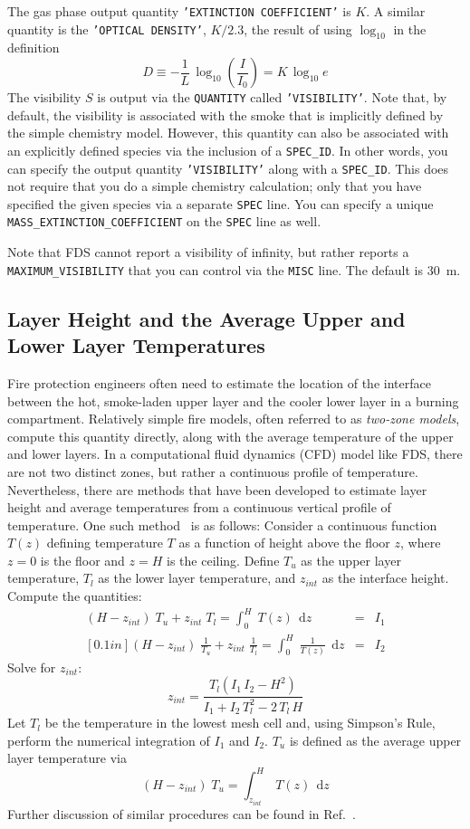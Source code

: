 \documentclass[11pt]{book}
\newcommand{\ct}{\tt\small}
\renewcommand{\d}{\,\mathrm{d}}
\newcommand{\be}{\begin{equation}}
\newcommand{\ee}{\end{equation}}
\begin{document}
The gas phase output quantity {\ct 'EXTINCTION COEFFICIENT'} is $K$. A similar quantity is the
{\ct 'OPTICAL DENSITY'}, $K/2.3$, the result of using $\log_{10}$ in the definition
\be D \equiv - \frac{1}{L} \, \log_{10} \left( \frac{I}{I_0} \right) = K \, \log_{10} e   \ee
The visibility $S$ is output via the {\ct QUANTITY} called {\ct 'VISIBILITY'}. Note
that, by default, the visibility is associated with the smoke that is implicitly defined by the simple chemistry
model. However, this quantity can also be associated with an
explicitly defined species via the inclusion of a {\ct SPEC\_ID}.
In other words, you can specify the output quantity {\ct 'VISIBILITY'} along with a {\ct SPEC\_ID}.
This does not require that you do a simple chemistry calculation; only that you have specified the given species via a separate
{\ct SPEC} line. You can
specify a unique {\ct MASS\_EXTINCTION\_COEFFICIENT} on the {\ct SPEC} line as well.

Note that FDS cannot report a visibility of infinity, but rather reports a {\ct MAXIMUM\_VISIBILITY} that you can control via the
{\ct MISC} line. The default is 30~m.


\subsection{Layer Height and the Average Upper and Lower Layer Temperatures}
\label{info:layerheight}

Fire protection engineers often need to estimate the location of the
interface between the hot, smoke-laden upper layer and the cooler
lower layer in a burning compartment.  Relatively simple fire models,
often referred to as {\em two-zone models}, compute this quantity
directly, along with the average temperature of the upper and lower
layers.  In a computational fluid dynamics (CFD) model like FDS, there
are not two distinct zones, but rather a continuous profile of
temperature. Nevertheless, there are methods that have been developed
to estimate layer height and average temperatures from a continuous
vertical profile of temperature. One such
method~\cite{Janssens:JFS1992} is as follows: Consider a continuous
function $T(z)$ defining temperature $T$ as a function of height above
the floor $z$, where $z=0$ is the floor and $z=H$ is the
ceiling. Define $T_u$ as the upper layer temperature, $T_l$ as the
lower layer temperature, and $z_{int}$ as the interface
height. Compute the quantities:
\begin{eqnarray*} (H-z_{int})\; T_u + z_{int} \; T_l = \int_0^H \; T(z) \; \d z &=& I_1 \\ [0.1in]
                  (H-z_{int})\; \frac{1}{T_u} + z_{int} \; \frac{1}{T_l} = \int_0^H \; \frac{1}{T(z)} \; \d z &=& I_2
\end{eqnarray*}
Solve for $z_{int}$:
\be z_{int} = \frac{ T_l(I_1 \, I_2 - H^2)}{I_1+I_2 \, T_l^2 - 2\, T_l \, H} \ee
Let $T_l$ be the temperature in the lowest mesh cell and, using
Simpson's Rule, perform the numerical integration of $I_1$ and
$I_2$. $T_u$ is defined as the average upper layer temperature via
\be (H-z_{int})\; T_u = \int_{z_{int}}^H \; T(z) \; \d z \ee
Further discussion of similar procedures can be found in Ref.~\cite{He:1}.
\end{document}
